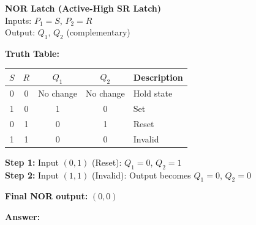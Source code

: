 \documentclass{article}
\begin{document}
\vspace{1em}
\textbf{NOR Latch (Active-High SR Latch)}\\
Inputs: $P_1 = S$, $P_2 = R$\\
Output: $Q_1$, $Q_2$ (complementary)

\textbf{Truth Table:}
\begin{center}
\begin{tabular}{|c|c|c|c|l|}
\hline
$S$ & $R$ & $Q_1$ & $Q_2$ & Description \\
\hline
0 & 0 & No change & No change & Hold state \\
1 & 0 & 1 & 0 & Set \\
0 & 1 & 0 & 1 & Reset \\
1 & 1 & 0 & 0 & Invalid \\
\hline
\end{tabular}
\end{center}

\textbf{Step 1:} Input $(0, 1)$ (Reset): $Q_1 = 0$, $Q_2 = 1$\\
\textbf{Step 2:} Input $(1, 1)$ (Invalid): Output becomes $Q_1 = 0$, $Q_2 = 0$

\vspace{0.5em}
\noindent\textbf{Final NOR output:} $(0, 0)$

\vspace{1em}
\noindent\textbf{Answer:} 
\end{document}
